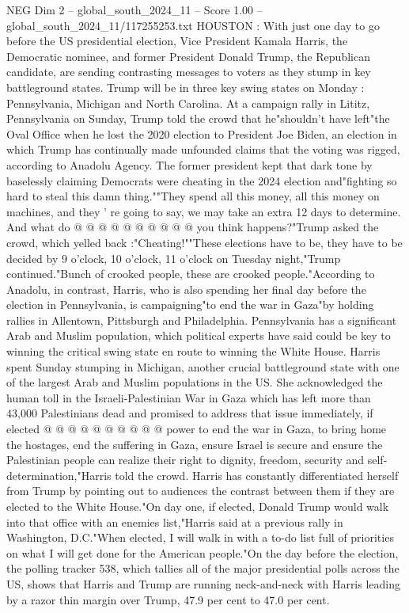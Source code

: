 \begin{textsample}{NEG Dim 2 – global\_south\_2024\_11 – Score 1.00 – global\_south\_2024\_11/117255253.txt}  \label{ex:f2_neg_205}
HOUSTON : With just one day to go before the US presidential election, Vice President Kamala Harris, the Democratic nominee, and former President Donald Trump, the Republican candidate, are sending contrasting messages to voters as they stump in key battleground states.
Trump will be in three key swing states on Monday : Pennsylvania, Michigan and North Carolina.
At a campaign rally in Lititz, Pennsylvania on Sunday, Trump told the crowd that he"shouldn't have left"the Oval Office when he lost the 2020 election to President Joe Biden, an election in which Trump has continually made unfounded claims that the voting was rigged, according to Anadolu Agency.
The former president kept that dark tone by baselessly claiming Democrats were cheating in the 2024 election and"fighting so hard to steal this damn thing.""They spend all this money, all this money on machines, and they ' re going to say, we may take an extra 12 days to determine.
And what do @ @ @ @ @ @ @ @ @ @ you think happens?"Trump asked the crowd, which yelled back :"Cheating!""These elections have to be, they have to be decided by 9 o'clock, 10 o'clock, 11 o'clock on Tuesday night,"Trump continued."Bunch of crooked people, these are crooked people."According to Anadolu, in contrast, Harris, who is also spending her final day before the election in Pennsylvania, is campaigning"to end the war in Gaza"by holding rallies in Allentown, Pittsburgh and Philadelphia.
Pennsylvania has a significant Arab and Muslim population, which political experts have said could be key to winning the critical swing state en route to winning the White House.
Harris spent Sunday stumping in Michigan, another crucial battleground state with one of the largest Arab and Muslim populations in the US.
She acknowledged the human toll in the Israeli-Palestinian War in Gaza which has left more than 43,000 Palestinians dead and promised to address that issue immediately, if elected @ @ @ @ @ @ @ @ @ @ power to end the war in Gaza, to bring home the hostages, end the suffering in Gaza, ensure Israel is secure and ensure the Palestinian people can realize their right to dignity, freedom, security and self-determination,"Harris told the crowd.
Harris has constantly differentiated herself from Trump by pointing out to audiences the contrast between them if they are elected to the White House."On day one, if elected, Donald Trump would walk into that office with an enemies list,"Harris said at a previous rally in Washington, D.C."When elected, I will walk in with a to-do list full of priorities on what I will get done for the American people."On the day before the election, the polling tracker 538, which tallies all of the major presidential polls across the US, shows that Harris and Trump are running neck-and-neck with Harris leading by a razor thin margin over Trump, 47.9 per cent to 47.0 per cent.

\end{textsample}
